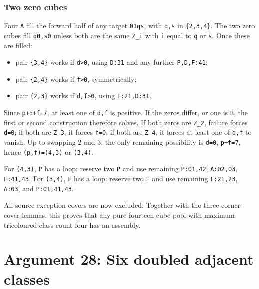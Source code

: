 \documentclass[
  10pt,
]{article}
\providecommand{\tightlist}{%
  \setlength{\itemsep}{0pt}\setlength{\parskip}{0pt}}
\begin{document}
\hypertarget{two-zero-cubes}{%
\subsubsection*{Two zero cubes}\label{two-zero-cubes}}

Four \texttt{A} fill the forward half of any target
\texttt{01\textbar{}qs}, with \texttt{q,s} in \texttt{\{2,3,4\}}. The
two zero cubes fill \texttt{q0,s0} unless both are the same
\texttt{Z\_i} with \texttt{i} equal to \texttt{q} or \texttt{s}. Once
these are filled:

\begin{itemize}
\tightlist
\item
  pair \texttt{\{3,4\}} works if \texttt{d\textgreater{}0}, using
  \texttt{D:31} and any further \texttt{P,D,F:41};
\item
  pair \texttt{\{2,4\}} works if \texttt{f\textgreater{}0},
  symmetrically;
\item
  pair \texttt{\{2,3\}} works if \texttt{d,f\textgreater{}0}, using
  \texttt{F:21,D:31}.
\end{itemize}

Since \texttt{p+d+f=7}, at least one of \texttt{d,f} is positive. If the
zeros differ, or one is \texttt{B}, the first or second construction
therefore solves. If both zeros are \texttt{Z\_2}, failure forces
\texttt{d=0}; if both are \texttt{Z\_3}, it forces \texttt{f=0}; if both
are \texttt{Z\_4}, it forces at least one of \texttt{d,f} to vanish. Up
to swapping 2 and 3, the only remaining possibility is \texttt{d=0},
\texttt{p+f=7}, hence \texttt{(p,f)=(4,3)} or \texttt{(3,4)}.

For \texttt{(4,3)}, \texttt{P} has a loop: reserve two \texttt{P} and
use remaining \texttt{P:01,42}, \texttt{A:02,03}, \texttt{F:41,43}. For
\texttt{(3,4)}, \texttt{F} has a loop: reserve two \texttt{F} and use
remaining \texttt{F:21,23}, \texttt{A:03}, and \texttt{P:01,41,43}.

All source-exception covers are now excluded. Together with the three
corner-cover lemmas, this proves that any pure fourteen-cube pool with
maximum tricoloured-class count four has an assembly.

\hypertarget{arg-28}{%
\section{Argument 28: Six doubled adjacent classes}\label{arg-28}}
\end{document}
